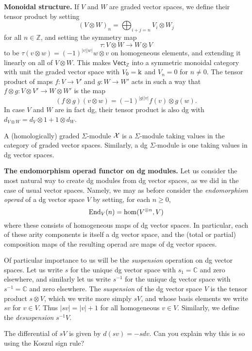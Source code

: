 \textbf{Monoidal structure.} If $V$ and $W$ are
graded vector spaces, we define their tensor product
by setting
\[ (V\otimes W)_n = \bigoplus_{i+j = n} V_i\otimes W_j \]
for all $n\in\mathbb Z$, and setting the symmetry map
\[\tau : V\otimes W \longrightarrow W\otimes V\]
to be $\tau(v\otimes w) = (-1)^{|v||w|}w\otimes v$
on homogeneous elements, and extending it linearly on all of
$V\otimes W$. This makes $\mathsf{Vect}_\mathbb{Z}$ into a
symmetric monoidal category with unit the graded vector
space with $V_0 = \Bbbk$ and $V_n = 0$ for $n\neq 0$.
The tensor product of maps $f: V\longrightarrow V'$
and $g : W\longrightarrow W'$ acts
in such a way that $f\otimes g : V\otimes V'
\longrightarrow W\otimes W'$ is the map
\[ (f\otimes g)(v\otimes w)  = (-1)^{|g||v|} f(v)\otimes g(w).\]
In case $V$ and $W$ are in fact dg, their tensor product is
also dg with $d_{V\otimes W} = d_V\otimes 1+ 1\otimes d_W$. 

\begin{definition}
A (homologically) graded $\Sigma$-module $\mathcal{X}$
is a $\Sigma$-module taking values in the category
of graded vector spaces. Similarly, a dg $\Sigma$-module
is one taking values in dg vector spaces.
\end{definition}

\textbf{The endomorphism operad functor on dg modules.}
Let us consider the most natural way to create dg modules
from dg vector spaces, as we did in the case of usual
vector spaces. Namely, we may as before consider the
\emph{endomorphism operad} of a dg vector space $V$
by setting, for each $n\geqslant 0$,
\[ \operatorname{End}_V(n) = \hom(V^{\otimes n},V) \]
where these consists of homogeneous maps of dg vector
spaces. In particular, each of these arity components is 
itself a dg vector space, and the (total or partial)
composition maps
of the resulting operad are maps of dg vector spaces.

Of particular importance to us will be the \emph{suspension}
operation on dg vector spaces. Let us write $s$ for the
unique dg vector space with $s_1 = \mathbb C$ and zero
elsewhere, and similarly let us write $s^{-1}$ for the
unique dg vector space with $s^{-1} = \mathbb{C}$
and zero elsewhere. The \emph{suspension} of the dg vector
space $V$ is the tensor product $s\otimes V$, which
we write more simply $sV$, and whose basis elements we
write $sv$ for $v\in V$. Thus $|sv| = |v|+1$ for all 
homogeneous $v\in V$. Similarly, we define the
\emph{desuspension} $s^{-1}V$.

\begin{note}
The differential of $sV$ is given by $d(sv) = -s dv$. Can you explain why this is so using
the Koszul sign rule?
\end{note}
 
